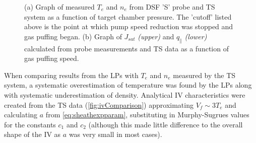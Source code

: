 \documentclass[a4paper, 11pt]{article} %
\begin{document}
	\begin{figure}[t!]
		\vspace{-5pt}
		\caption{
			(a) Graph of measured $T_e$ and $n_e$ from DSF 'S' probe and TS system as a function of target chamber pressure. 
			The 'cutoff' listed above is the point at which pump speed reduction was stopped and gas puffing began. 
			(b) Graph of $J_{sat}$ \textit{(upper)} and $q_{\parallel}$ \textit{(lower)} calculated from probe measurements and TS data as a function of gas puffing speed.
		}
		\vspace{-15pt}
	\end{figure}
	
	When comparing results from the LPs with $T_e$ and $n_e$ measured by the TS system, a systematic overestimation of temperature was found by the LPs along with systematic underestimation of density.
	Analytical IV characteristics were created from the TS data (\cref{fig:ivComparison}) approximating $V_f \sim 3 T_e$\cite{Stangeby2000} and calculating $a$ from \cref{eq:sheathexpparam}, substituting in Murphy-Sugrues values for the constants $c_1$ and $c_2$ (although this made little difference to the overall shape of the IV as $a$ was very small in most cases).
	
\end{document}
